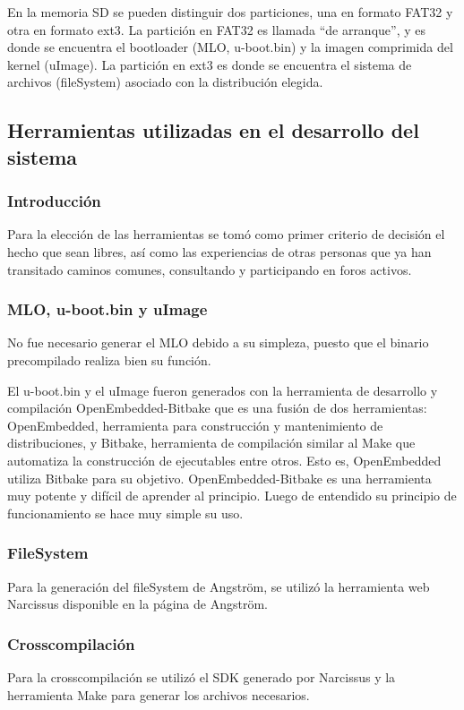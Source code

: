 \documentclass[%
        final,
        notitlepage,
        narroweqnarray,
        inline,
        ]{ieee}
\begin{document}
En la memoria SD se pueden distinguir dos particiones, una en formato FAT32 y otra
en formato ext3. La partición en FAT32 es llamada “de arranque”, y es donde se encuentra 
el bootloader (MLO, u-boot.bin) y la imagen comprimida del kernel (uImage). 
La partición en ext3 es donde se encuentra el sistema de archivos (fileSystem) asociado con la distribución elegida.


\subsection{Herramientas utilizadas en el desarrollo del sistema}

\subsubsection{Introducción}
Para la elección de las herramientas se tomó como primer criterio de decisión el hecho que sean libres, así como las experiencias de otras personas que ya han transitado caminos comunes, consultando y participando en foros activos.


\subsubsection{MLO, u-boot.bin y uImage}
No fue necesario generar el MLO debido a su simpleza, puesto que el binario precompilado realiza bien su función.

El u-boot.bin y el uImage fueron generados con la herramienta de desarrollo y compilación OpenEmbedded-Bitbake \cite{OE-Bb} que es una fusión de dos herramientas: OpenEmbedded, herramienta para construcción y mantenimiento de distribuciones, y Bitbake, herramienta de compilación similar al Make que automatiza la construcción de ejecutables entre otros. Esto es, OpenEmbedded utiliza Bitbake para su objetivo. OpenEmbedded-Bitbake es una herramienta muy potente y difícil de aprender al principio. Luego de entendido su principio de funcionamiento se hace muy simple su uso.


\subsubsection{FileSystem}
Para la generación del fileSystem de Angström, se utilizó la herramienta web Narcissus disponible en la página de Angström.


\subsubsection{Crosscompilación}
Para la crosscompilación se utilizó el SDK generado por Narcissus y la herramienta Make para generar los archivos necesarios.
\end{document}

